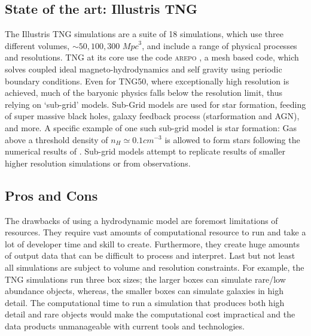 \subsection{State of the art: Illustris TNG}
The Illustris TNG simulations are a suite of 18 simulations, which use three different volumes, $\sim 50, 100, 300$ ${Mpc}^{3}$, and include a range of physical processes and resolutions. TNG at its core use the code \textsc{arepo} \citep{Springel2010EMesh}, a mesh based code, which solves coupled ideal magneto-hydrodynamics and self gravity using periodic boundary conditions. Even for TNG50, where exceptionally high resolution is achieved, much of the baryonic physics falls below the resolution limit, thus relying on `sub-grid' models. Sub-Grid models are used for star formation, feeding of super massive black holes, galaxy feedback process (starformation and AGN), and more. A specific example of one such sub-grid model is star formation: Gas above a threshold density of $n_H \simeq 0.1cm^{-3}$ is allowed to form stars following the numerical results of \citet{Springel2003CosmologicalFormation}. Sub-grid models attempt to replicate results of smaller higher resolution simulations or from observations. 

\subsection{Pros and Cons}
The drawbacks of using a hydrodynamic model are foremost limitations of resources. They require vast amounts of computational resource to run and take a lot of developer time and skill to create. Furthermore, they create huge amounts of output data that can be difficult to process and interpret. Last but not least all simulations are subject to volume and resolution constraints. For example, the TNG simulations run three box sizes; the larger boxes can simulate rare/low abundance objects, whereas, the smaller boxes can simulate galaxies in high detail. The computational time to run a simulation that produces both high detail and rare objects would make the computational cost impractical and the data products unmanageable with current tools and technologies. 

